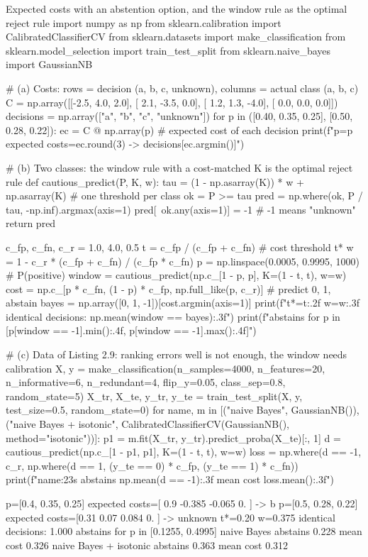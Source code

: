 \begin{pylisting}[label={lst:costcautious}]{Expected costs with an abstention option, and the window rule as the optimal reject rule}
import numpy as np
from sklearn.calibration import CalibratedClassifierCV
from sklearn.datasets import make_classification
from sklearn.model_selection import train_test_split
from sklearn.naive_bayes import GaussianNB

# (a) Costs: rows = decision (a, b, c, unknown), columns = actual class (a, b, c)
C = np.array([[-2.5,  4.0,  2.0],
              [ 2.1, -3.5,  0.0],
              [ 1.2,  1.3, -4.0],
              [ 0.0,  0.0,  0.0]])
decisions = np.array(["a", "b", "c", "unknown"])
for p in ([0.40, 0.35, 0.25], [0.50, 0.28, 0.22]):
    ec = C @ np.array(p)                       # expected cost of each decision
    print(f"p={p}  expected costs={ec.round(3)}  ->  {decisions[ec.argmin()]}")

# (b) Two classes: the window rule with a cost-matched K is the optimal reject rule
def cautious_predict(P, K, w):
    tau = (1 - np.asarray(K)) * w + np.asarray(K)      # one threshold per class
    ok = P >= tau
    pred = np.where(ok, P / tau, -np.inf).argmax(axis=1)
    pred[~ok.any(axis=1)] = -1                          # -1 means "unknown"
    return pred

c_fp, c_fn, c_r = 1.0, 4.0, 0.5
t = c_fp / (c_fp + c_fn)                                # cost threshold t*
w = 1 - c_r * (c_fp + c_fn) / (c_fp * c_fn)
p = np.linspace(0.0005, 0.9995, 1000)                   # P(positive)
window = cautious_predict(np.c_[1 - p, p], K=(1 - t, t), w=w)
cost = np.c_[p * c_fn, (1 - p) * c_fp, np.full_like(p, c_r)]   # predict 0, 1, abstain
bayes = np.array([0, 1, -1])[cost.argmin(axis=1)]
print(f"t*={t:.2f}  w={w:.3f}  identical decisions: {np.mean(window == bayes):.3f}")
print(f"abstains for p in [{p[window == -1].min():.4f}, {p[window == -1].max():.4f}]")

# (c) Data of Listing 2.9: ranking errors well is not enough, the window needs calibration
X, y = make_classification(n_samples=4000, n_features=20, n_informative=6, n_redundant=4,
                           flip_y=0.05, class_sep=0.8, random_state=5)
X_tr, X_te, y_tr, y_te = train_test_split(X, y, test_size=0.5, random_state=0)
for name, m in [("naive Bayes", GaussianNB()),
                ("naive Bayes + isotonic",
                 CalibratedClassifierCV(GaussianNB(), method="isotonic"))]:
    p1 = m.fit(X_tr, y_tr).predict_proba(X_te)[:, 1]
    d = cautious_predict(np.c_[1 - p1, p1], K=(1 - t, t), w=w)
    loss = np.where(d == -1, c_r, np.where(d == 1, (y_te == 0) * c_fp, (y_te == 1) * c_fn))
    print(f"{name:23s} abstains {np.mean(d == -1):.3f}  mean cost {loss.mean():.3f}")
\end{pylisting}
\begin{pyoutput}
p=[0.4, 0.35, 0.25]  expected costs=[ 0.9   -0.385 -0.065  0.   ]  ->  b
p=[0.5, 0.28, 0.22]  expected costs=[0.31  0.07  0.084 0.   ]  ->  unknown
t*=0.20  w=0.375  identical decisions: 1.000
abstains for p in [0.1255, 0.4995]
naive Bayes             abstains 0.228  mean cost 0.326
naive Bayes + isotonic  abstains 0.363  mean cost 0.312
\end{pyoutput}

